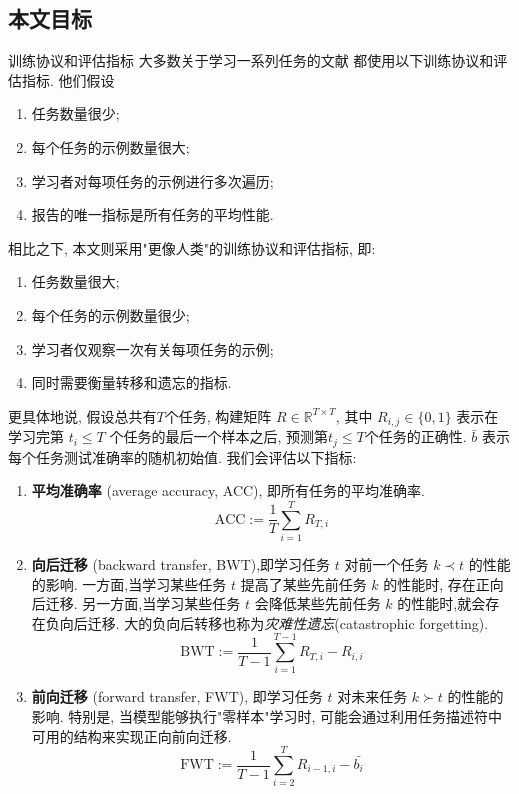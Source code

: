 \subsection{本文目标}
训练协议和评估指标 大多数关于学习一系列任务的文献 \cite{rusu2016progressive, fernando2017pathnet, kirkpatrick2017overcoming, rebuffiICaRLIncrementalClassifier2017} 都使用以下训练协议和评估指标. 他们假设
\begin{enumerate}[itemsep=-1.2mm,topsep=0pt]
    \item 任务数量很少;
    \item 每个任务的示例数量很大;
    \item 学习者对每项任务的示例进行多次遍历;
    \item 报告的唯一指标是所有任务的平均性能.
\end{enumerate}

\noindent 相比之下, 本文则采用"更像人类"的训练协议和评估指标, 即:
\begin{enumerate}[itemsep=-1.2mm,topsep=0pt]
    \item 任务数量很大;
    \item 每个任务的示例数量很少;
    \item 学习者仅观察一次有关每项任务的示例;
    \item 同时需要衡量转移和遗忘的指标.
\end{enumerate}

\noindent 更具体地说, 假设总共有$T$个任务, 构建矩阵 $R\in \mathbb{R}^{T\times T}$, 其中 $R_{i,j}\in\{0,1\}$ 表示在学习完第 $t_i\leq T$ 个任务的最后一个样本之后, 预测第$t_j\leq T$个任务的正确性. $\bar{b}$ 表示每个任务测试准确率的随机初始值. 我们会评估以下指标:
\begin{enumerate}[label={},wide,labelwidth=!,itemindent=!,labelindent=0pt]
    \item \textbf{平均准确率} (average accuracy, ACC), 即所有任务的平均准确率.
    \[
        \text{ACC}:=\frac{1}{T}\sum_{i=1}^T R_{T,i}
    \]
    \item \textbf{向后迁移} (backward transfer, BWT),即学习任务 $t$ 对前一个任务 $k\prec t$ 的性能的影响. 一方面,当学习某些任务 $t$ 提高了某些先前任务 $k$ 的性能时, 存在正向后迁移. 另一方面,当学习某些任务 $t$ 会降低某些先前任务 $k$ 的性能时,就会存在负向后迁移. 大的负向后转移也称为\textit{灾难性遗忘}(catastrophic forgetting).
    \[
        \text{BWT}:=\frac{1}{T-1}\sum_{i=1}^{T-1} R_{T, i} - R_{i, i}
    \]
    \item \textbf{前向迁移} (forward transfer, FWT), 即学习任务 $t$ 对未来任务 $k\succ t$ 的性能的影响. 特别是, 当模型能够执行"零样本"学习时, 可能会通过利用任务描述符中可用的结构来实现正向前向迁移.
    \[
        \text{FWT}:=\frac{1}{T-1}\sum_{i=2}^{T} R_{i-1, i} - \bar{b_i}
    \]
\end{enumerate}





